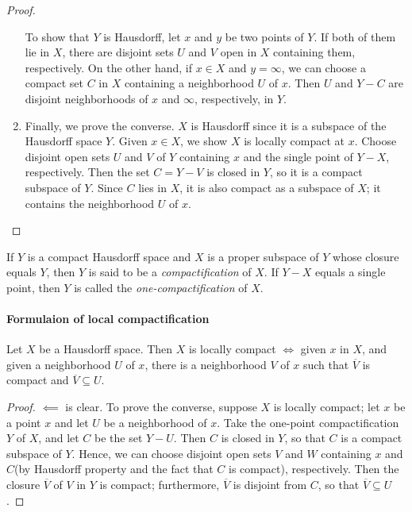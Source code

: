 \begin{proof}
\begin{enumerate}
         To show that \( Y \) is Hausdorff, let \( x \) and \( y \) be two points of \( Y \).
         If both of them lie in \( X \), there are disjoint sets \( U \) and \( V \) open in \( X \) containing them, respectively.
         On the other hand, if \( x \in X \) and \( y = \infty \), we can choose a compact set \( C \) in \( X \) containing a neighborhood \( U \) of \( x \).
         Then \( U \) and \( Y - C \) are disjoint neighborhoods of \( x \) and \( \infty \), respectively, in \( Y \).
     \item Finally, we prove the converse.
       \( X \) is Hausdorff since it is a subspace of the Hausdorff space \( Y \).
       Given \( x \in X \), we show \( X \) is locally compact at \( x \).
       Choose disjoint open sets \( U \) and \( V \) of \( Y \) containing \( x \) and the single point of \( Y - X \), respectively.
       Then the set \( C = Y - V \) is closed in \( Y \), so it is a compact subspace of \( Y \).
       Since \( C \) lies in \( X \), it is also compact as a subspace of \( X \);
       it contains the neighborhood \( U \) of \( x \).
  \end{enumerate}
\end{proof}

\begin{definition}
  If \( Y \) is a compact Hausdorff space and \( X \) is a proper subspace of \( Y \) whose closure equals \( Y \), then \( Y \) is said to be a \emph{compactification} of \( X \).
  If \( Y - X \) equals a single point, then \( Y \) is called the \emph{one-compactification} of \( X \).
\end{definition}

\paragraph{Formulaion of local compactification}

\begin{theorem}
  Let \( X \) be a Hausdorff space.
  Then \( X \) is locally compact \( \iff \) given \( x \) in \( X \), and given a neighborhood \( U \) of \( x \), there is a neighborhood \( V \) of \( x \) such that \( \overline{V} \) is compact and \( \overline{V} \subseteq U \).
\end{theorem}
\begin{proof}
  \( \impliedby \) is clear.
  To prove the converse, suppose \( X \) is locally compact; let \( x \) be a point \( x \) and let \( U \) be a neighborhood of \( x \).
  Take the one-point compactification \( Y \) of \( X \), and let \( C \) be the set \( Y - U \).
  Then \( C \) is closed in \( Y \), so that \( C \) is a compact subspace of \( Y \).
  Hence, we can choose disjoint open sets \( V \) and \( W \) containing \( x \) and \( C \)(by Hausdorff property and the fact that \( C \) is compact), respectively.
  Then the closure \( \overline{V} \) of \( V \) in \( Y \) is compact; furthermore, \( \overline{V} \) is disjoint from \( C \), so that \( \overline{V} \subseteq U \).
\end{proof}

